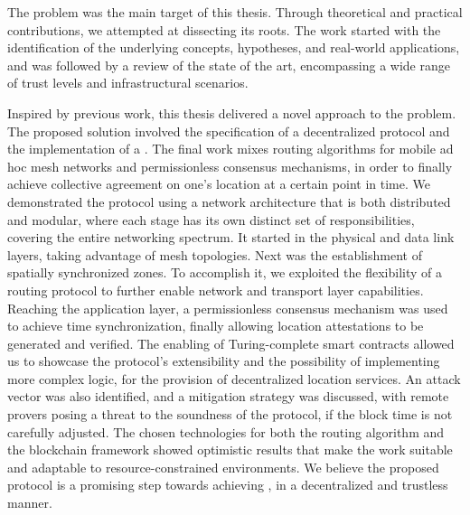 The \pol{} problem was the main target of this thesis. Through theoretical and practical contributions, we attempted at dissecting its roots. The work started with the identification of the underlying concepts, hypotheses, and real-world applications, and was followed by a review of the state of the art, encompassing a wide range of trust levels and infrastructural scenarios. 

Inspired by previous work, this thesis delivered a novel approach to the problem. The proposed solution involved the specification of a decentralized \pol{} protocol and the implementation of a \poc{}. The final work mixes routing algorithms for mobile ad hoc mesh networks and permissionless consensus mechanisms, in order to finally achieve collective agreement on one's location at a certain point in time. We demonstrated the protocol using a network architecture that is both distributed and modular, where each stage has its own distinct set of responsibilities, covering the entire networking spectrum. It started in the physical and data link layers, taking advantage of mesh topologies. Next was the establishment of spatially synchronized zones. To accomplish it, we exploited the flexibility of a routing protocol to further enable network and transport layer capabilities. Reaching the application layer, a permissionless consensus mechanism was used to achieve time synchronization, finally allowing location attestations to be generated and verified. The enabling of Turing-complete smart contracts allowed us to showcase the protocol's extensibility and the possibility of implementing more complex logic, for the provision of decentralized location services. An attack vector was also identified, and a mitigation strategy was discussed, with remote provers posing a threat to the soundness of the protocol, if the block time is not carefully adjusted. The chosen technologies for both the routing algorithm and the blockchain framework showed optimistic results that make the work suitable and adaptable to resource-constrained environments. We believe the proposed protocol is a promising step towards achieving \pol{}, in a decentralized and trustless manner.

